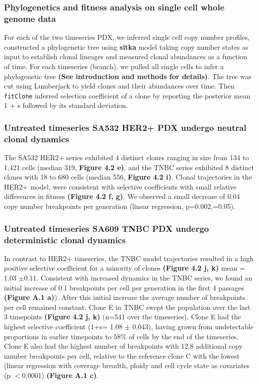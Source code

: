 \subsubsection{Phylogenetics and fitness analysis on single cell whole genome data}
For each of the two timeseries PDX, we inferred single cell copy number profiles, constructed a phylogenetic tree using \textbf{sitka} model taking copy number states as input to establish clonal lineages and measured clonal abundances as a function of time. For each timeseries (branch), we pulled all single cells to infer a phylogenetic tree \textbf{(See introduction and methods for details)}. The tree was cut using Lumberjack to yield clones and their abundances over time. Then \texttt{fitClone} inferred selection coefficient of a clone by reporting the posterior mean 1 + s followed by its standard deviation.

\subsubsection{Untreated timeseries SA532 HER2+ PDX undergo neutral clonal dynamics}
 The SA532 HER2+ series exhibited 4 distinct clones ranging in size from 134 to 1,421 cells (median 319, \textbf{Figure 4.2 e)}, and the TNBC series exhibited 8 distinct clones with 18 to 680 cells (median 556, \textbf{Figure 4.2 i)}. Clonal trajectories in the HER2+ model, were consistent with selective coefficients with small relative differences in fitness \textbf{(Figure 4.2 f, g)}.
 We observed a small decrease of 0.04 copy number breakpoints per generation (linear regression, p=0.002,=0.05). 

\subsubsection{Untreated timeseries SA609 TNBC PDX undergo deterministic clonal dynamics}
In contrast to HER2+ timeseries, the TNBC model trajectories resulted in a high positive selective coefficient for a minority of clones \textbf{(Figure 4.2 j, k)} mean = 1.03 $\pm $0.11. Consistent with increased dynamics in the TNBC series, we found an initial increase of 0.1 breakpoints per cell per generation in the first 4 passages  \textbf{(Figure A.1 a)}). After this initial increase the average number of breakpoints per cell remained constant.
 Clone E in TNBC swept the population over the last 3 timepoints \textbf{(Figure 4.2 j, k)} (n=541 over the timeseries). Clone E had the highest selective coefficient (1+s= 1.08 $\pm $ 0.043), having grown from undetectable proportions in earlier timepoints to 58\% of cells by the end of the timeseries. Clone E also had the highest number of breakpoints with 12.8 additional copy number breakpoints per cell, relative to the reference clone C with the lowest (linear regression with coverage breadth, ploidy and cell cycle state as covariates (p $<$0.0001) \textbf{(Figure A.1 c)}.


